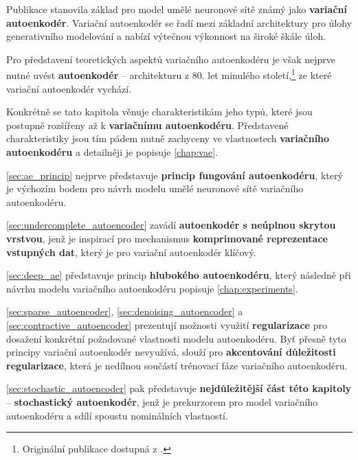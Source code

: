 Publikace \textcite{Kingma2014} stanovila základ pro model umělé neuronové sítě známý jako \textbf{variační autoenkodér}.
Variační autoenkodér se řadí mezi základní architektury pro úlohy generativního modelování a nabízí výtečnou výkonnost na široké škále úloh. \cite{Kingma2014, Kingma2019}

Pro představení teoretických aspektů variačního autoenkodéru je však nejprve nutné uvést \textbf{autoenkodér} – architekturu z 80. let minulého století,\footnote{Originální publikace dostupná z \textcite{Rumelhart1987}.} ze které variační autoenkodér vychází.

Konkrétně se tato kapitola věnuje charakteristikám jeho typů, které jsou postupně rozšířeny až k \textbf{variačnímu autoenkodéru}.
Představené charakteristiky jsou tím pádem nutně zachyceny ve vlastnostech \textbf{variačního autoenkodéru} a detailněji je popisuje \autoref{chap:vae}.

\autoref{sec:ae_princip} nejprve představuje \textbf{princip fungování autoenkodéru}, který je výchozím bodem pro návrh modelu umělé neuronové sítě variačního autoenkodéru.

\autoref{sec:undercomplete_autoencoder} zavádí \textbf{autoenkodér s neúplnou skrytou vrstvou}, jenž je inspirací pro mechanismus \textbf{komprimované reprezentace vstupných dat}, který je pro variační autoenkodér klíčový.

\autoref{sec:deep_ae} představuje princip \textbf{hlubokého autoenkodéru}, který následně při návrhu modelu variačního autoenkodéru popisuje \autoref{chap:experiments}.

\autoref{sec:sparse_autoencoder}, \autoref{sec:denoising_autoencoder} a \autoref{sec:contractive_autoencoder} prezentují možnosti využití \textbf{regularizace} pro dosažení konkrétní požadované vlastnosti modelu autoenkodéru.
Byť přesně tyto principy variační autoenkodér nevyužívá, slouží pro \textbf{akcentování důležitosti regularizace}, která je nedílnou součástí trénovací fáze variačního autoenkodéru.

\autoref{sec:stochastic_autoencoder} pak představuje \textbf{nejdůležitější část této kapitoly} – \textbf{stochastický autoenkodér}, jenž je prekurzorem pro model variačního autoenkodéru a sdílí spoustu nominálních vlastností.
\newpage
